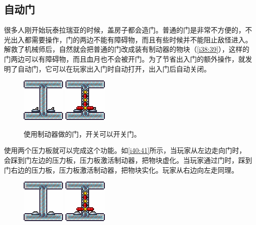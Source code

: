 \subsection{自动门}

很多人刚开始玩泰拉瑞亚的时候，盖房子都会造门。普通的门是非常不方便的，不光出入都需要操作，门的两边不能有障碍物，而且有些时候并不能阻止敌怪进入。解救了机械师后，自然就会把普通的门改成装有制动器的物块（\autoref{i38:39}），这样的门两边可以有障碍物，而且血月也不会被开门。为了节省出入门的额外操作，就发明了自动门，它可以在玩家出入门时自动打开，出入门后自动关闭。

\begin{figure}[!h]
\begin{center}
\includegraphics{images/38.png}
\qquad
\includegraphics{images/39.png}
\end{center}
\caption{使用制动器做的门，开关可以开关门。}
\label{i38:39}
\end{figure}

使用两个压力板就可以完成这个功能。如\autoref{i40:41}所示，当玩家从左边走向门时，会踩到门左边的压力板，压力板激活制动器，把物块虚化。当玩家通过门时，踩到门右边的压力板，压力板激活制动器，把物块实化。玩家从右边向左走同理。

\begin{figure}[!h]
\begin{center}
\includegraphics{images/40.png}
\qquad
\includegraphics{images/41.png}
\end{center}
\caption{}
\label{i40:41}
\end{figure}

